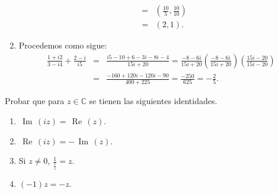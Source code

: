 \documentclass[twoside]{book}
\renewcommand{\Re}{\,\operatorname{Re}\,}
\renewcommand{\Im}{\,\operatorname{Im}\,}
\def\C{\mathbb{C}}
\begin{document}
\begin{sol}
\begin{solucion}{}
\begin{enumerate}[label=\alph*).]
\begin{eqnarray*}
                      & = & \left(\frac{10}{5},\frac{10}{10}\right)\\
                      & = & (2,1).
                  \end{eqnarray*}
            \item Procedemos como sigue:
                  \begin{eqnarray*}
                      \frac{1+i2}{3-i4}+\frac{2-i}{i5} & = & \frac{i5-10+6-3i-8i-4}{15i + 20}= \frac{-8-6i}{15i +20} \left(\frac{-8-6i}{15i +20}\right)\left(\frac{15i - 20}{15i - 20}\right)\\
                      &=& \frac{-160 +120i -120i - 90}{400 + 225}= \frac{-250}{625}= -\frac{2}{5}.
                  \end{eqnarray*}
        \end{enumerate}
    \end{solucion}
\end{sol}
\begin{example}{}
    Probar que para $z\in\C$ se tienen las siguientes identidades.
    \begin{multicols}{3}
        \begin{enumerate}[label=\alph*).]
            \item $\Im(iz)=\Re(z)$.
            \item $\Re(iz)=-\Im(z)$.
            \item Si $z\neq0$, $\displaystyle\frac{1}{\frac{1}{z}}=z$.
            \item $(-1)z=-z$.
        \end{enumerate}
    \end{multicols}
\end{example}
\end{document}
